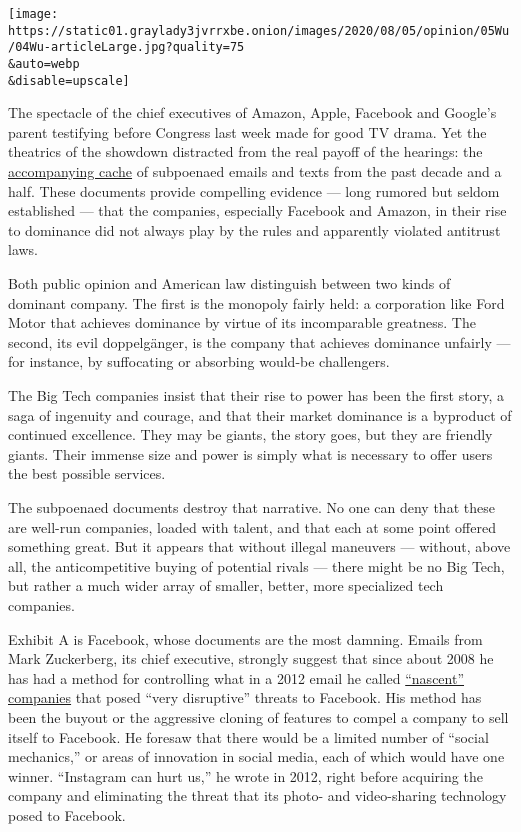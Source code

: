 \texttt{[image: https://static01.graylady3jvrrxbe.onion/images/2020/08/05/opinion/05Wu/04Wu-articleLarge.jpg?quality=75\\\&auto=webp\\\&disable=upscale]}

The spectacle of the chief executives of Amazon, Apple, Facebook and
Google's parent testifying before Congress last week made for good TV
drama. Yet the theatrics of the showdown distracted from the real payoff
of the hearings: the
\href{https://judiciary.house.gov/online-platforms-and-market-power/}{accompanying
cache} of subpoenaed emails and texts from the past decade and a half.
These documents provide compelling evidence --- long rumored but seldom
established --- that the companies, especially Facebook and Amazon, in
their rise to dominance did not always play by the rules and apparently
violated antitrust laws.

Both public opinion and American law distinguish between two kinds of
dominant company. The first is the monopoly fairly held: a corporation
like Ford Motor that achieves dominance by virtue of its incomparable
greatness. The second, its evil doppelgänger, is the company that
achieves dominance unfairly --- for instance, by suffocating or
absorbing would-be challengers.

The Big Tech companies insist that their rise to power has been the
first story, a saga of ingenuity and courage, and that their market
dominance is a byproduct of continued excellence. They may be giants,
the story goes, but they are friendly giants. Their immense size and
power is simply what is necessary to offer users the best possible
services.

The subpoenaed documents destroy that narrative. No one can deny that
these are well-run companies, loaded with talent, and that each at some
point offered something great. But it appears that without illegal
maneuvers --- without, above all, the anticompetitive buying of
potential rivals --- there might be no Big Tech, but rather a much wider
array of smaller, better, more specialized tech companies.

Exhibit A is Facebook, whose documents are the most damning. Emails from
Mark Zuckerberg, its chief executive, strongly suggest that since about
2008 he has had a method for controlling what in a 2012 email he called
\href{https://papers.ssrn.com/sol3/papers.cfm?abstract_id=3624058}{``nascent''
companies} that posed ``very disruptive'' threats to Facebook. His
method has been the buyout or the aggressive cloning of features to
compel a company to sell itself to Facebook. He foresaw that there would
be a limited number of ``social mechanics,'' or areas of innovation in
social media, each of which would have one winner. ``Instagram can hurt
us,'' he wrote in 2012, right before acquiring the company and
eliminating the threat that its photo- and video-sharing technology
posed to Facebook.


